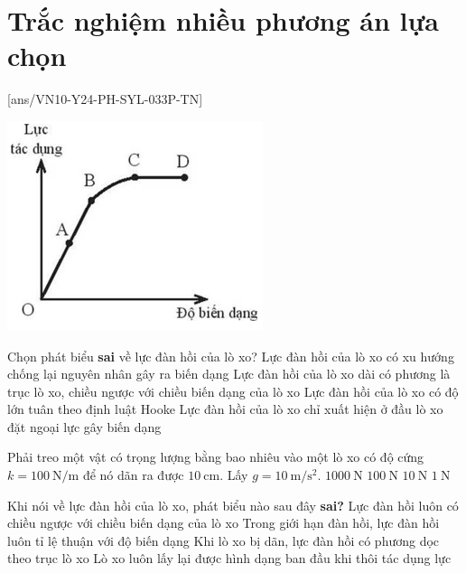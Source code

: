 \let\lesson\undefined
\newcommand{\lesson}{\phantomlesson{Bài 22 + 23.}}
\setcounter{section}{2}
\section{Trắc nghiệm nhiều phương án lựa chọn}
\setcounter{ex}{0}
[ans/VN10-Y24-PH-SYL-033P-TN]
\begin{ex}
	{\includegraphics[scale=0.55]{../figs/VN10-2023-PH-TP033-2}}
	\loigiai{}
\end{ex}
\begin{ex}
	Chọn phát biểu \textbf{sai} về lực đàn hồi của lò xo?
	\choice
	{Lực đàn hồi của lò xo có xu hướng chống lại nguyên nhân gây ra biến dạng}
	{Lực đàn hồi của lò xo dài có phương là trục lò xo, chiều ngược với chiều biến dạng của lò xo}
	{Lực đàn hồi của lò xo có độ lớn tuân theo định luật Hooke}
	{\True Lực đàn hồi của lò xo chỉ xuất hiện ở đầu lò xo đặt ngoại lực gây biến dạng}
	\loigiai{}
\end{ex}
\begin{ex}
	Phải treo một vật có trọng lượng bằng bao nhiêu vào một lò xo có độ cứng $k =\SI{100}{\newton/\meter}$ để nó dãn ra được $\SI{10}{\centi\meter}$. Lấy $g =\SI{10}{\meter/\second^2}$.
	\choice
	{$\SI{1000}{\newton}$}
	{$\SI{100}{\newton}$}
	{\True $\SI{10}{\newton}$}
	{$\SI{1}{\newton}$}
\end{ex}
\begin{ex}
Khi nói về lực đàn hồi của lò xo, phát biểu nào sau đây \textbf{sai?}	
	\choice
	{Lực đàn hồi luôn có chiều ngược với chiều biến dạng của lò xo}
	{Trong giới hạn đàn hồi, lực đàn hồi luôn tỉ lệ thuận với độ biến dạng}
	{Khi lò xo bị dãn, lực đàn hồi có phương dọc theo trục lò xo}
	{\True Lò xo luôn lấy lại được hình dạng ban đầu khi thôi tác dụng lực}
\end{ex}
		
